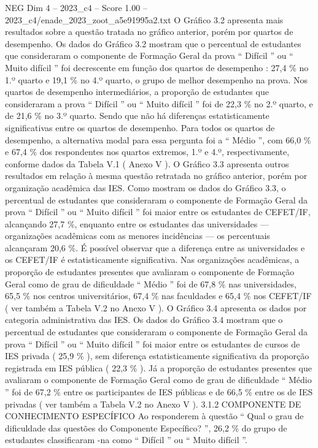 \begin{textsample}{NEG Dim 4 – 2023\_c4 – Score 1.00 – 2023\_c4/enade\_2023\_zoot\_a5e91995a2.txt}
O Gráfico 3.2 apresenta mais resultados sobre a questão tratada no gráfico anterior, porém por quartos de desempenho.
Os dados do Gráfico 3.2 mostram que o percentual de estudantes que consideraram o componente de Formação Geral da prova “ Difícil ” ou “ Muito difícil ” foi decrescente em função dos quartos de desempenho : 27,4 \% no 1.º quarto e 19,1 \% no 4.º quarto, o grupo de melhor desempenho na prova.
Nos quartos de desempenho intermediários, a proporção de estudantes que consideraram a prova “ Difícil ” ou “ Muito difícil ” foi de 22,3 \% no 2.º quarto, e de 21,6 \% no 3.º quarto.
Sendo que não há diferenças estatisticamente significativas entre os quartos de desempenho.
Para todos os quartos de desempenho, a alternativa modal para essa pergunta foi a “ Médio ”, com 66,0 \% e 67,4 \% dos respondentes nos quartos extremos, 1.º e 4.º, respectivamente, conforme dados da Tabela V.1 ( Anexo V ).
O Gráfico 3.3 apresenta outros resultados em relação à mesma questão retratada no gráfico anterior, porém por organização acadêmica das IES.
Como mostram os dados do Gráfico 3.3, o percentual de estudantes que consideraram o componente de Formação Geral da prova “ Difícil ” ou “ Muito difícil ” foi maior entre os estudantes de CEFET/IF, alcançando 27,7 \%, enquanto entre os estudantes das universidades — organizações acadêmicas com as menores incidências — os percentuais alcançaram 20,6 \%.
É possível observar que a diferença entre as universidades e os CEFET/IF é estatisticamente significativa.
Nas organizações acadêmicas, a proporção de estudantes presentes que avaliaram o componente de Formação Geral como de grau de dificuldade “ Médio ” foi de 67,8 \% nas universidades, 65,5 \% nos centros universitários, 67,4 \% nas faculdades e 65,4 \% nos CEFET/IF ( ver também a Tabela V.2 no Anexo V ).
O Gráfico 3.4 apresenta os dados por categoria administrativa das IES.
Os dados do Gráfico 3.4 mostram que o percentual de estudantes que consideraram o componente de Formação Geral da prova “ Difícil ” ou “ Muito difícil ” foi maior entre os estudantes de cursos de IES privada ( 25,9 \% ), sem diferença estatisticamente significativa da proporção registrada em IES pública ( 22,3 \% ).
Já a proporção de estudantes presentes que avaliaram o componente de Formação Geral como de grau de dificuldade “ Médio ” foi de 67,2 \% entre os participantes de IES públicas e de 66,5 \% entre os de IES privadas ( ver também a Tabela V.2 no Anexo V ). 3.1.2 COMPONENTE DE CONHECIMENTO ESPECÍFICO Ao responderem à questão “ Qual o grau de dificuldade das questões do Componente Específico? ”, 26,2 \% do grupo de estudantes classificaram -na como “ Difícil ” ou “ Muito difícil ”.

\end{textsample}
